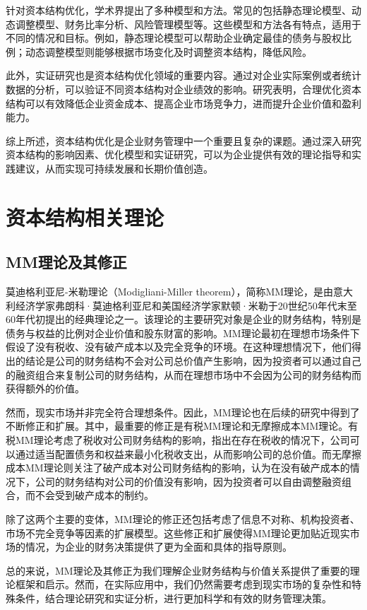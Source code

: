 针对资本结构优化，学术界提出了多种模型和方法。常见的包括静态理论模型、动态调整模型、财务比率分析、风险管理模型等。这些模型和方法各有特点，适用于不同的情况和目标。例如，静态理论模型可以帮助企业确定最佳的债务与股权比例；动态调整模型则能够根据市场变化及时调整资本结构，降低风险。

此外，实证研究也是资本结构优化领域的重要内容。通过对企业实际案例或者统计数据的分析，可以验证不同资本结构对企业绩效的影响。研究表明，合理优化资本结构可以有效降低企业资金成本、提高企业市场竞争力，进而提升企业价值和盈利能力。

综上所述，资本结构优化是企业财务管理中一个重要且复杂的课题。通过深入研究资本结构的影响因素、优化模型和实证研究，可以为企业提供有效的理论指导和实践建议，从而实现可持续发展和长期价值创造。
\section{资本结构相关理论}
\subsection{MM理论及其修正}
莫迪格利亚尼-米勒理论（Modigliani-Miller theorem），简称MM理论，是由意大利经济学家弗朗科·莫迪格利亚尼和美国经济学家默顿·米勒于20世纪50年代末至60年代初提出的经典理论之一。\cite{Modigliani1958}该理论的主要研究对象是企业的财务结构，特别是债务与权益的比例对企业价值和股东财富的影响。MM理论最初在理想市场条件下假设了没有税收、没有破产成本以及完全竞争的环境。在这种理想情况下，他们得出的结论是公司的财务结构不会对公司总价值产生影响，因为投资者可以通过自己的融资组合来复制公司的财务结构，从而在理想市场中不会因为公司的财务结构而获得额外的价值。

然而，现实市场并非完全符合理想条件。因此，MM理论也在后续的研究中得到了不断修正和扩展。其中，最重要的修正是有税MM理论和无摩擦成本MM理论。有税MM理论考虑了税收对公司财务结构的影响，指出在存在税收的情况下，公司可以通过适当配置债务和权益来最小化税收支出，从而影响公司的总价值。而无摩擦成本MM理论则关注了破产成本对公司财务结构的影响，认为在没有破产成本的情况下，公司的财务结构对公司的价值没有影响，因为投资者可以自由调整融资组合，而不会受到破产成本的制约。\cite{Dong2019}

除了这两个主要的变体，MM理论的修正还包括考虑了信息不对称、机构投资者、市场不完全竞争等因素的扩展模型。这些修正和扩展使得MM理论更加贴近现实市场的情况，为企业的财务决策提供了更为全面和具体的指导原则。\cite{Yang2014}

总的来说，MM理论及其修正为我们理解企业财务结构与价值关系提供了重要的理论框架和启示。然而，在实际应用中，我们仍然需要考虑到现实市场的复杂性和特殊条件，结合理论研究和实证分析，进行更加科学和有效的财务管理决策。
